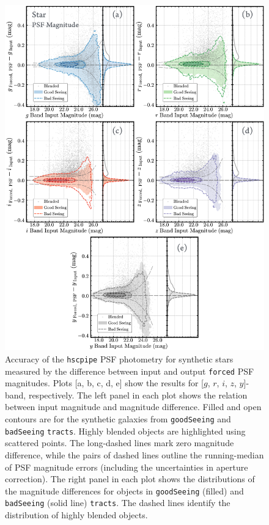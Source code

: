 \documentclass[useamsfonts]{pasj01}
\def\forced{\texttt{forced}}
\def\tracts{\texttt{tracts}}
\begin{document}
\begin{figure}
    \begin{center}
        \includegraphics[width=16cm]{fig/synpipe_psf_mag}
    \end{center}
    \caption{
        Accuracy of the \texttt{hscpipe} PSF photometry for synthetic stars measured
        by the difference between input and output \forced{} PSF magnitudes.
        Plots [a, b, c, d, e] show the results for [$g$, $r$, $i$, $z$, $y$]-band, 
        respectively.
        The left panel in each plot shows the relation between input magnitude and
        magnitude difference.
        Filled and open contours are for the synthetic galaxies 
        from \texttt{goodSeeing} and \texttt{badSeeing} \tracts{}.
        Highly blended objects are highlighted using scattered points.
        The long-dashed lines mark zero magnitude difference, while the pairs of
        dashed lines outline the running-median of PSF magnitude errors
        (including the uncertainties in aperture correction).
        The right panel in each plot shows the distributions of the magnitude 
        differences for objects in \texttt{goodSeeing} (filled) and \texttt{badSeeing}
        (solid line) \tracts{}.
        The dashed lines identify the distribution of highly blended objects.
        }
    \label{fig:psf_mag}
\end{figure}
\end{document}
